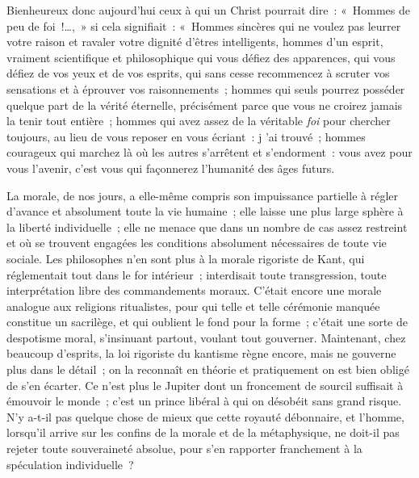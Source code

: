 \documentclass[french,twoside]{book} %
\begin{document}
Bienheureux donc aujourd’hui ceux à qui un Christ pourrait dire : « Hommes de peu de foi !…, » si cela signifiait : « Hommes sincères qui ne voulez pas leurrer votre raison et ravaler votre dignité d’êtres intelligents, hommes d’un esprit, vraiment scientifique et philosophique qui vous défiez des apparences, qui vous défiez de vos yeux et de vos esprits, qui sans cesse recommencez à scruter vos sensations et à éprouver vos raisonnements ; hommes qui seuls pourrez posséder quelque part de la vérité éternelle, précisément parce que vous ne croirez jamais la tenir tout entière ; hommes qui avez assez de la véritable \emph{foi} pour chercher toujours, au lieu de vous reposer en vous écriant : j ’ai trouvé ; hommes courageux qui marchez là où les autres s’arrêtent et s’endorment : vous avez pour vous l’avenir, c’est vous qui façonnerez l’humanité des âges futurs.\par
La morale, de nos jours, a elle-même compris son impuissance partielle à régler d’avance et absolument toute la vie humaine ; elle laisse une plus large sphère à la liberté individuelle ; elle ne menace que dans un nombre de cas assez restreint et où se trouvent engagées les conditions absolument nécessaires de toute vie sociale. Les philosophes n’en sont plus à la morale rigoriste de Kant, qui réglementait tout dans le for intérieur ; interdisait toute transgression, toute interprétation libre des commandements moraux. C’était encore une morale analogue aux religions ritualistes, pour qui telle et telle cérémonie manquée constitue un sacrilège, et qui oublient le fond pour la forme ; c’était une sorte de despotisme moral, s’insinuant partout, voulant tout gouverner. Maintenant, chez beaucoup d’esprits, la loi rigoriste du kantisme règne encore, mais ne gouverne plus dans le détail ; on la reconnaît en théorie et pratiquement on est bien obligé de s’en écarter. Ce n’est plus le Jupiter dont un froncement de sourcil suffisait à émouvoir le monde ; c’est un prince libéral à qui on désobéit sans grand risque. N’y a-t-il pas quelque chose de mieux que cette royauté débonnaire, et l’homme, lorsqu’il arrive sur les confins de la morale et de la métaphysique, ne doit-il pas rejeter toute souveraineté absolue, pour s’en rapporter franchement à la spéculation individuelle ?\par
\end{document}
